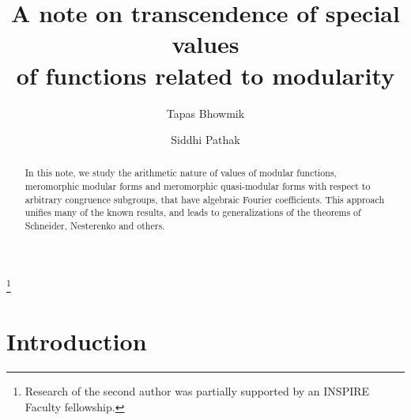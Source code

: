 \documentclass[11pt, reqno]{amsart}
\begin{document}
\title[Transcendence of special values of modular functions]{A note on transcendence of special values \\ of functions related to modularity}

\author[T. Bhowmik]{Tapas Bhowmik}

\author[S. Pathak]{Siddhi Pathak}

\address{Department of Mathematics, University of South Carolina, 1523 Greene Street, LeConte College, Columbia, South Carolina, USA 29208.}

\address{Chennai Mathematical Institute, H-1 SIPCOT IT Park, Siruseri, Kelambakkam, Tamil Nadu, India 603103.}





\thanks{Research of the second author was partially supported by an INSPIRE Faculty fellowship.}



\begin{abstract}
In this note, we study the arithmetic nature of values of modular functions, meromorphic modular forms and meromorphic quasi-modular forms with respect to arbitrary congruence subgroups, that have algebraic Fourier coefficients. This approach unifies many of the known results, and leads to generalizations of the theorems of Schneider, Nesterenko and others. 
\end{abstract}

\maketitle

\section{\bf Introduction}
\bigskip
\end{document}
